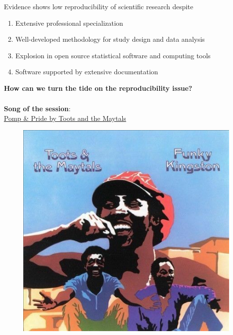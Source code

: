 \documentclass[xcolor=dvipsnames]{beamer}
\begin{document}
\begin{frame}
\frametitle{\insertsectionhead}
Evidence shows low reproducibility of scientific research despite
\begin{enumerate}
\item Extensive professional specialization
\item Well-developed methodology for study design and data analysis
\item Explosion in open source statistical software and computing tools
\item Software supported by extensive documentation
\end{enumerate}
\textbf{How can we turn the tide on the reproducibility issue?}
\end{frame}

\begin{frame}
\frametitle{\insertsectionhead}
\textbf{Song of the session}:\\
\href{https://www.youtube.com/watch?v=FB-DgI7wM1Y}{Pomp \& Pride by Toots and the Maytals}
\begin{figure}
\includegraphics[scale=0.5]{images/funky_kingston.jpg}
\end{figure}
\end{frame}
\end{document}
